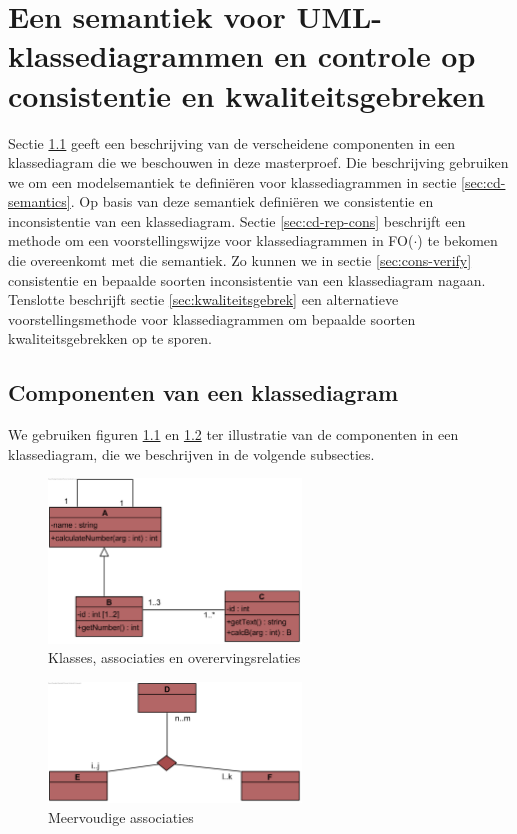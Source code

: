 \chapter{Een semantiek voor UML-klassediagrammen en controle op consistentie en kwaliteitsgebreken}\label{sec:consistentie}
Sectie \ref{sec:cd-components} geeft een beschrijving van de verscheidene componenten in een klassediagram die we beschouwen in deze masterproef. Die beschrijving gebruiken we om een modelsemantiek te defini\"eren voor klassediagrammen in sectie \ref{sec:cd-semantics}. Op basis van deze semantiek defini\"eren we consistentie en inconsistentie van een klassediagram. Sectie \ref{sec:cd-rep-cons} beschrijft een methode om een voorstellingswijze voor klassediagrammen in FO($\cdot$) te bekomen die overeenkomt met die semantiek. Zo kunnen we in sectie \ref{sec:cons-verify} consistentie en bepaalde soorten inconsistentie van een klassediagram nagaan. Tenslotte beschrijft sectie \ref{sec:kwaliteitsgebrek} een alternatieve voorstellingsmethode voor klassediagrammen om bepaalde soorten kwaliteitsgebrekken op te sporen.

\section{Componenten van een klassediagram}\label{sec:cd-components}

We gebruiken figuren \ref{fig:voorbeeld1} en \ref{fig:voorbeeld2} ter illustratie van de componenten in een klassediagram, die we beschrijven in de volgende subsecties.

\begin{figure}[h]
	\centering
	\includegraphics[width=0.6\textwidth]{chap-consistentie/voorbeeld1.png}
	\caption{Klasses, associaties en overervingsrelaties}
	\label{fig:voorbeeld1}
\end{figure}

\begin{figure}[h]
	\centering
	\includegraphics[width=0.6\textwidth]{chap-consistentie/voorbeeld2.png}
	\caption{Meervoudige associaties}
	\label{fig:voorbeeld2}
\end{figure}

